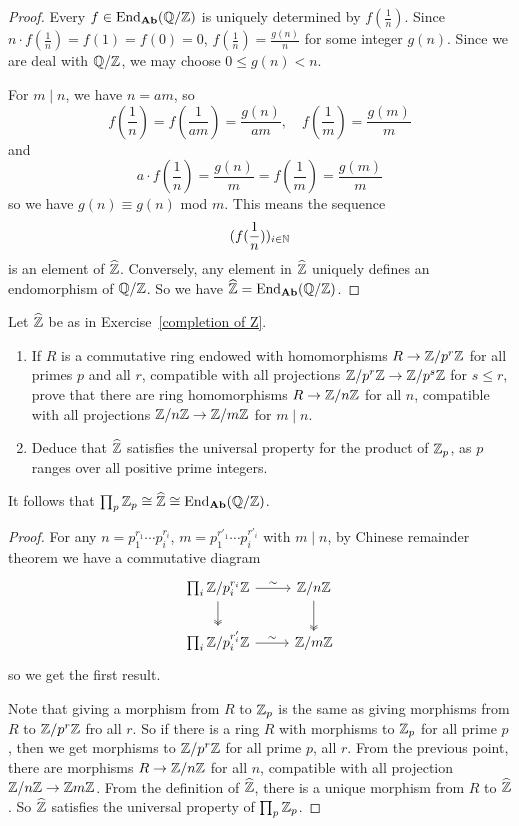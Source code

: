\begin{proof}
Every $f\in\mathrm{End}_{\mathbf{Ab}}(\mathbb{Q}/\mathbb{Z})$ is uniquely determined by $f(\frac{1}{n})$. Since $n\cdot f(\frac{1}{n})=f(1)=f(0)=0$, $f(\frac{1}{n})=\frac{g(n)}{n}$ for some integer $g(n)$. Since we are deal with $\mathbb{Q}/\mathbb{Z}$, we may choose $0\leq g(n)<n$.\par
For $m\mid n$, we have $n=am$, so
\[f(\dfrac{1}{n})=f(\dfrac{1}{am})=\dfrac{g(n)}{am},\quad f(\dfrac{1}{m})=\dfrac{g(m)}{m}\]
and
\[a\cdot f(\dfrac{1}{n})=\dfrac{g(n)}{m}=f(\dfrac{1}{m})=\dfrac{g(m)}{m}\]
so we have $g(n)\equiv g(n)$ mod $m$. This means the sequence
\[(f(\dfrac{1}{n}))_{i\in\mathbb{N}}\]
is an element of $\widehat{\mathbb{Z}}$. Conversely, any element in $\widehat{\mathbb{Z}}$ uniquely defines an endomorphism of $\mathbb{Q}/\mathbb{Z}$. So we have $\widehat{\mathbb{Z}}=\mathrm{End}_{\mathbf{Ab}}(\mathbb{Q}/\mathbb{Z})$.
\end{proof}
\begin{exercise}
Let $\widehat{\mathbb{Z}}$ be as in Exercise~\ref{completion of Z}.
\begin{enumerate}
\item If $R$ is a commutative ring endowed with homomorphisms $R\to\mathbb{Z}/p^r\mathbb{Z}$ for all primes $p$ and all $r$, compatible with all projections $\mathbb{Z}/p^r\mathbb{Z}\to\mathbb{Z}/p^s\mathbb{Z}$ for $s\leq r$, prove that there are ring homomorphisms $R\to\mathbb{Z}/n\mathbb{Z}$ for all $n$, compatible with all projections $\mathbb{Z}/n\mathbb{Z}\to\mathbb{Z}/m\mathbb{Z}$ for $m\mid n$.
\item Deduce that $\widehat{\mathbb{Z}}$ satisfies the universal property for the product of $\mathbb{Z}_p$, as $p$ ranges over all positive prime integers.
\end{enumerate}
It follows that $\prod_p\mathbb{Z}_p\cong\widehat{\mathbb{Z}}\cong\mathrm{End}_{\mathbf{Ab}}(\mathbb{Q}/\mathbb{Z})$.
\end{exercise}
\begin{proof}
For any $n=p_1^{r_1}\cdots p_i^{r_i}$, $m=p_1^{r'_1}\cdots p_i^{r'_i}$ with $m\mid n$, by Chinese remainder theorem we have a commutative diagram
\[\begin{tikzcd}
\prod_{i}\Z/p_i^{r_i}\Z\ar[r,"\sim"]\ar[d, twoheadrightarrow]&\Z/n\Z\ar[d, twoheadrightarrow]\\
\prod_{i}\Z/p_i^{r'_i}\Z\ar[r,"\sim"]&\Z/m\Z
\end{tikzcd}\]
so we get the first result.\par
Note that giving a morphism from $R$ to $\mathbb{Z}_p$ is the same as giving morphisms from $R$ to $\mathbb{Z}/p^r\mathbb{Z}$ fro all $r$. So if there is a ring $R$ with morphisms to $\mathbb{Z}_p$ for all prime $p$, then we get morphisms to $\mathbb{Z}/p^r\mathbb{Z}$ for all prime $p$, all $r$. From the previous point, there are morphisms $R\to\mathbb{Z}/n\mathbb{Z}$ for all $n$, compatible with all projection $\mathbb{Z}/n\mathbb{Z}\to\mathbb{Z} m\mathbb{Z}$. From the definition of $\widehat{\mathbb{Z}}$, there is a unique morphism from $R$ to $\widehat{\mathbb{Z}}$. So $\widehat{\mathbb{Z}}$ satisfies the universal property of $\prod_p\mathbb{Z}_p$.
\end{proof}
